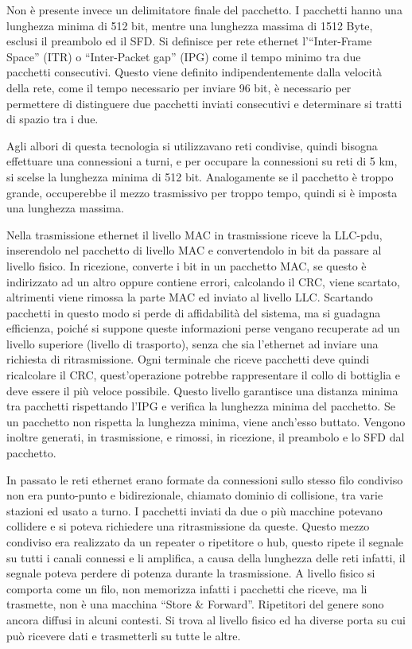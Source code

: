 \documentclass{article}
\numberwithin{equation}{subsection}
\begin{document}
Non è presente invece un delimitatore finale del pacchetto. I pacchetti hanno una lunghezza minima di 512 bit, mentre una lunghezza massima di 1512 Byte, esclusi il preambolo ed il SFD. Si definisce per rete ethernet 
l'``Inter-Frame Space'' (ITR) o ``Inter-Packet gap'' (IPG) come il tempo minimo tra due pacchetti consecutivi. Questo viene definito indipendentemente dalla velocità della rete, come il tempo necessario per 
inviare 96 bit, è necessario per permettere di distinguere due pacchetti inviati consecutivi e determinare si tratti di spazio tra i due. 

Agli albori di questa tecnologia si utilizzavano reti condivise, quindi bisogna effettuare una connessioni a turni, e per occupare la connessioni su reti di 5 km, si scelse la lunghezza minima di 512 bit. 
Analogamente se il pacchetto è troppo grande, occuperebbe il mezzo trasmissivo per troppo tempo, quindi si è imposta una lunghezza massima. 


Nella trasmissione ethernet il livello MAC in trasmissione riceve la LLC-pdu, inserendolo nel pacchetto di livello MAC e convertendolo in bit da passare al livello fisico. In ricezione, converte i bit in un pacchetto 
MAC, se questo è indirizzato ad un altro oppure contiene errori, calcolando il CRC, viene scartato, altrimenti viene rimossa la parte MAC ed inviato al livello LLC. 
Scartando pacchetti in questo modo si perde di affidabilità del sistema, ma si guadagna efficienza, poiché si suppone queste informazioni perse vengano recuperate ad un livello superiore (livello di trasporto), 
senza che sia l'ethernet ad inviare una richiesta di ritrasmissione. Ogni terminale che riceve pacchetti deve quindi ricalcolare il CRC, quest'operazione potrebbe rappresentare il collo di bottiglia e deve essere il 
più veloce possibile. Questo livello garantisce una distanza minima tra pacchetti rispettando l'IPG e verifica la lunghezza minima del pacchetto. Se un pacchetto non rispetta la lunghezza minima, viene anch'esso 
buttato. Vengono inoltre generati, in trasmissione, e rimossi, in ricezione, il preambolo e lo SFD dal pacchetto. 



In passato le reti ethernet erano formate da connessioni sullo stesso filo condiviso non era punto-punto e bidirezionale, chiamato dominio di collisione, tra varie stazioni ed usato a turno. I pacchetti inviati 
da due o più macchine potevano collidere e si poteva richiedere una ritrasmissione da queste. Questo mezzo condiviso era realizzato da un repeater o ripetitore o hub, questo ripete il segnale su tutti i canali connessi e li 
amplifica, a causa della lunghezza delle reti infatti, il segnale poteva perdere di potenza durante la trasmissione. A livello fisico si comporta come un filo, non memorizza infatti i pacchetti che riceve, 
ma li trasmette, non è una macchina ``Store \& Forward''. Ripetitori del genere sono ancora diffusi in alcuni contesti. 
Si trova al livello fisico ed ha diverse porta su cui può ricevere dati e trasmetterli su tutte le altre. 
\end{document}
